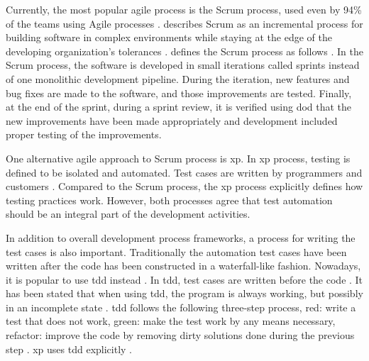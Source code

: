 Currently, the most popular agile process is the Scrum process, used even by 94\% of the teams using Agile processes \cite{rubin2012essential, scrum2018state}. \citeauthor{rising2000scrum} describes Scrum as an incremental process for building software in complex environments while staying at the edge of the developing organization's tolerances \cite{rising2000scrum}. \citeauthor{rubin2012essential} defines the Scrum process as follows \cite{rubin2012essential}. In the Scrum process, the software is developed in small iterations called sprints instead of one monolithic development pipeline. During the iteration, new features and bug fixes are made to the software, and those improvements are tested. Finally, at the end of the sprint, during a sprint review, it is verified using \gls{dod} that the new improvements have been made appropriately and development included proper testing of the improvements.

One alternative agile approach to Scrum process is \gls{xp}. In \gls{xp} process, testing is defined to be isolated and automated. Test cases are written by programmers and customers \cite{beck2000extreme}. Compared to the Scrum process, the \gls{xp} process explicitly defines how testing practices work. However, both processes agree that test automation should be an integral part of the development activities.

In addition to overall development process frameworks, a process for writing the test cases is also important. Traditionally the automation test cases have been written after the code has been constructed in a waterfall-like fashion. Nowadays, it is popular to use \gls{tdd} instead \cite{jorgensen2013software}. In \gls{tdd}, test cases are written before the code \cite{beck2003test}. It has been stated that when using \gls{tdd}, the program is always working, but possibly in an incomplete state \cite{jorgensen2013software}. \gls{tdd} follows the following three-step process, red: write a test that does not work, green: make the test work by any means necessary, refactor: improve the code by removing dirty solutions done during the previous step \cite{beck2003test}. \gls{xp} uses \gls{tdd} explicitly \cite{beck2000extreme}.

